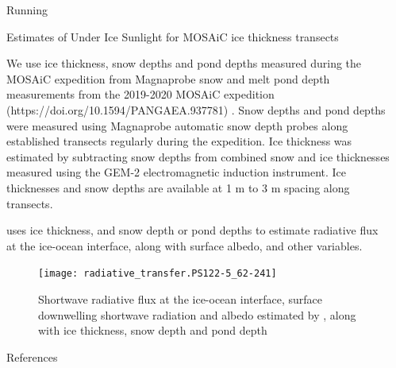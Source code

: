 \documentclass[final]{beamer}
\newlength{\sepwidth}
\newlength{\colwidth}
\newcommand{\separatorcolumn}{\begin{column}{\sepwidth}\end{column}}
\begin{document}
\begin{frame}[t,fragile]
\begin{columns}[t]
\begin{column}{\colwidth}
\begin{exampleblock}{Running }
    
  \end{exampleblock}

  \begin{block}{Estimates of Under Ice Sunlight for MOSAiC ice thickness transects}

    We use ice thickness, snow depths and pond depths measured during
    the MOSAiC expedition from Magnaprobe snow and melt pond depth
    measurements from the 2019-2020 MOSAiC expedition
    (https://doi.org/10.1594/PANGAEA.937781) \cite{itkin_sea_2023}.
    Snow depths and pond depths were measured using Magnaprobe
    automatic snow depth probes along established transects regularly
    during the expedition.  Ice thickness was estimated by subtracting
    snow depths from combined snow and ice thicknesses measured using
    the GEM-2 electromagnetic induction instrument.  Ice thicknesses
    and snow depths are available at 1 m to 3 m spacing along
    transects.

     uses ice thickness, and snow depth or pond depths
    to estimate radiative flux at the ice-ocean interface, along with
    surface albedo, and other variables.

    \begin{figure}[h]
      \texttt{[image: radiative\_transfer.PS122-5\_62-241]}
      \caption{Shortwave radiative flux at the ice-ocean interface, surface downwelling shortwave radiation and albedo estimated by , along with ice thickness, snow depth and pond depth}
    \end{figure}
      

  \end{block}

  
  \begin{block}{References}

    \nocite{*}
    \footnotesize{}

  \end{block}

\end{column}
\separatorcolumn



\end{columns}
\end{frame}
\end{document}
